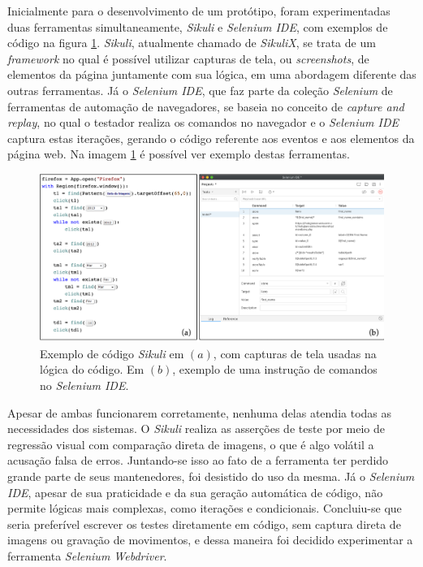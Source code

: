 Inicialmente para o desenvolvimento de um protótipo, foram experimentadas duas ferramentas simultaneamente, \emph{Sikuli} e \emph{Selenium IDE}, com exemplos de código na figura \ref{fig:e2e-ferramenta}. \emph{Sikuli}, atualmente chamado de \emph{SikuliX}, se trata de um \emph{framework} no qual é possível utilizar capturas de tela, ou \emph{screenshots}, de elementos da página juntamente com sua lógica, em uma abordagem diferente das outras ferramentas. Já o \emph{Selenium IDE}, que faz parte da coleção \emph{Selenium} de ferramentas de automação de navegadores, se baseia no conceito de \emph{capture and replay}, no qual o testador realiza os comandos no navegador e o \emph{Selenium IDE} captura estas iterações, gerando o código referente aos eventos e aos elementos da página web. Na imagem \ref{fig:e2e-ferramenta} é possível ver exemplo destas ferramentas.

\begin{figure}[H]
    \centering
    \includegraphics[width=15cm]{source/4-solucao/images/e2e-ferramenta.png}
    \caption{Exemplo de código \emph{Sikuli} em $(a)$, com capturas de tela usadas na lógica do código. Em $(b)$, exemplo de uma instrução de comandos no \emph{Selenium IDE}.}
    \label{fig:e2e-ferramenta}
\end{figure}

Apesar de ambas funcionarem corretamente, nenhuma delas atendia todas as necessidades dos sistemas. O \emph{Sikuli} realiza as asserções de teste por meio de regressão visual com comparação direta de imagens, o que é algo volátil a acusação falsa de erros. Juntando-se isso ao fato de a ferramenta ter perdido grande parte de seus mantenedores, foi desistido do uso da mesma. Já o \emph{Selenium IDE}, apesar de sua praticidade e da sua geração automática de código, não permite lógicas mais complexas, como iterações e condicionais. Concluiu-se que seria preferível escrever os testes diretamente em código, sem captura direta de imagens ou gravação de movimentos, e dessa maneira foi decidido experimentar a ferramenta \emph{Selenium Webdriver}.

